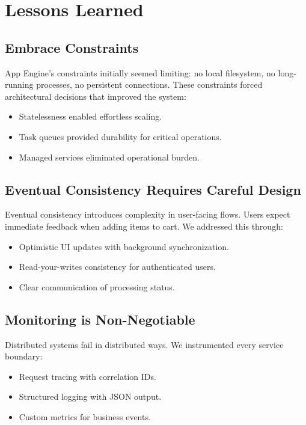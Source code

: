 \section{Lessons Learned}


\subsection{Embrace Constraints}

App Engine's constraints initially seemed limiting: no local filesystem, no long-running processes, no persistent connections. These constraints forced architectural decisions that improved the system:
\begin{itemize}
\item Statelessness enabled effortless scaling.
\item Task queues provided durability for critical operations.
\item Managed services eliminated operational burden.
\end{itemize}

\subsection{Eventual Consistency Requires Careful Design}

Eventual consistency introduces complexity in user-facing flows. Users expect immediate feedback when adding items to cart. We addressed this through:
\begin{itemize}
\item Optimistic UI updates with background synchronization.
\item Read-your-writes consistency for authenticated users.
\item Clear communication of processing status.
\end{itemize}

\subsection{Monitoring is Non-Negotiable}

Distributed systems fail in distributed ways. We instrumented every service boundary:
\begin{itemize}
\item Request tracing with correlation IDs.
\item Structured logging with JSON output.
\item Custom metrics for business events.
\end{itemize}

